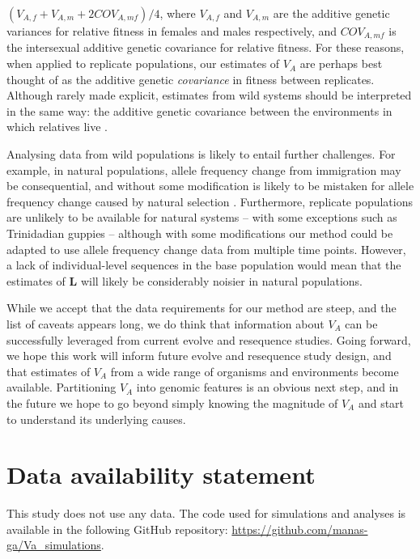 \documentclass[12pt]{article}
\begin{document}
\begin{bibunit}
$(V_{A,f} + V_{A,m} + 2COV_{A,mf})/4$, where $V_{A,f}$ and $V_{A,m}$ are the additive genetic variances for relative fitness in females and males respectively, and $COV_{A,mf}$ is the intersexual additive genetic covariance for relative fitness. For these reasons, when applied to replicate populations, our estimates of $V_A$ are perhaps best thought of as the additive genetic \emph{covariance} in fitness between replicates. Although rarely made explicit, estimates from wild systems should be interpreted in the same way: the additive genetic covariance between the environments in which relatives live \citep{Vehvilainen.2008}.   

Analysing data from wild populations is likely to entail further challenges. For example, in natural populations, allele frequency change from immigration may be consequential, and without some modification is likely to be mistaken for allele frequency change caused by natural selection \citep{simon2024contribution}. Furthermore, replicate populations are unlikely to be available for natural systems -- with some exceptions such as Trinidadian guppies \citep{reznick1996life} -- although with some modifications our method could be adapted to use allele frequency change data from multiple time points. However, a lack of individual-level sequences in the base population would mean that the estimates of $\textbf{L}$ will likely be considerably noisier in natural populations. 

While we accept that the data requirements for our method are steep, and the list of caveats appears long, we do think that information about $V_A$ can be successfully leveraged from current evolve and resequence studies. Going forward, we hope this work will inform future evolve and resequence study design, and that estimates of $V_A$ from a wide range of organisms and environments become available. Partitioning $V_A$ into genomic features is an obvious next step, and in the future we hope to go beyond simply knowing the magnitude of $V_A$ and start to understand its underlying causes.

\section*{Data availability statement}
This study does not use any data. The code used for simulations and analyses is available in the following GitHub repository: \url{https://github.com/manas-ga/Va_simulations}.


\end{bibunit}
\end{document}
